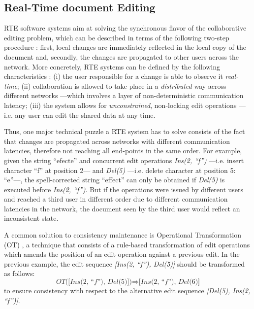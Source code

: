 \documentclass{sig-alternate}
\begin{document}
\subsection{Real-Time document Editing}\label{subsec:rte}
RTE software systems aim at solving the synchronous flavor of the collaborative editing
problem, which can be described in terms of the following two-step procedure \cite{Imine2009}:
first, local changes are immediately reflected in the local copy of the document and, secondly,
the changes are propagated to other users across the network.
More concretely, RTE systems can be defined by the following characteristics \cite{Sun1998}:
(i) the user responsible for a change is able to observe it \textit{real-time};
(ii) collaboration is allowed to take place in a \textit{distributed} way across
different networks ---which involves a layer of non-deterministic communication
latency; (iii) the system allows for \textit{unconstrained}, non-locking edit operations ---i.e.
any user can edit the shared data at any time.

Thus, one major technical puzzle a RTE system has to solve consists of the fact that changes
are propagated across networks with different communication latencies, therefore not
reaching all end-points in the same order. For example, given
the string ``efecte'' and concurrent edit operations \textit{Ins(2, ``f'')} ---i.e.
insert character ``f'' at position 2--- and \textit{Del(5)} ---i.e.
delete character at position 5: ``e''---, the spell-corrected string ``effect''
can only be obtained if \textit{Del(5)} is executed before \textit{Ins(2, ``f'')}.
But if the operations were issued by different users and reached a third user in different
order due to different communication latencies in the network,
the document seen by the third user would reflect an inconsistent state.

A common solution to consistency maintenance is Operational Transformation
(OT) \cite{SuClarence}, a technique that consists of a rule-based transformation
of edit operations which amends the position of an edit operation against a previous edit.
In the previous example, the edit sequence \textit{[Ins(2, ``f''), Del(5)]} should be
transformed as follows:
\begin{equation*}
  \textit{OT([Ins(2, ``f''), Del(5)])} \Rightarrow \textit{[Ins(2, ``f''), Del(6)]}
\end{equation*}
to ensure consistency with respect to the alternative edit sequence
\textit{[Del(5), Ins(2, ``f'')]}.

\end{document}
